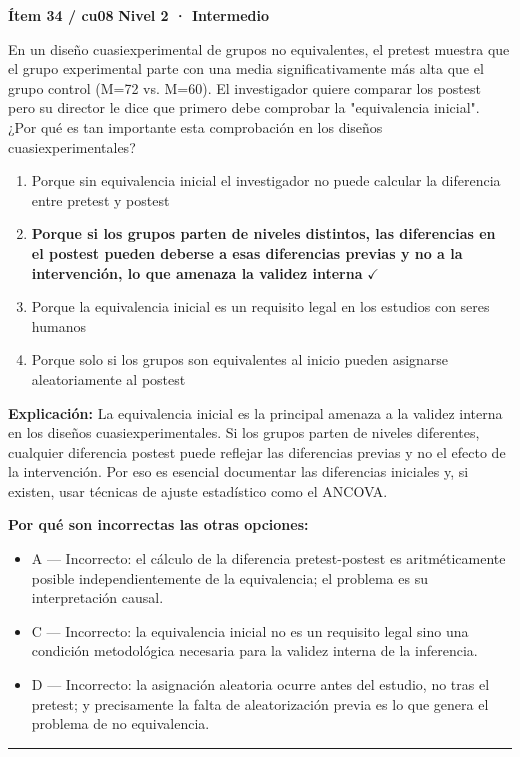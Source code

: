 \documentclass[12pt,a4paper]{article}
\begin{document}
\begin{mdframed}[backgroundcolor=fondogris,linecolor=ambar,linewidth=1pt,innerleftmargin=10pt,innerrightmargin=10pt,innertopmargin=7pt,innerbottommargin=7pt]
\textbf{Ítem 34 / cu08} \hfill {\small\bfseries\color{ambar} Nivel 2 · Intermedio}
\end{mdframed}

En un diseño cuasiexperimental de grupos no equivalentes, el pretest muestra que el grupo experimental parte con una media significativamente más alta que el grupo control (M=72 vs. M=60). El investigador quiere comparar los postest pero su director le dice que primero debe comprobar la "equivalencia inicial". ¿Por qué es tan importante esta comprobación en los diseños cuasiexperimentales?

\begin{enumerate}
  \item[A.] Porque sin equivalencia inicial el investigador no puede calcular la diferencia entre pretest y postest
  \item[\textbf{\color{verde}B.}] \textbf{\color{verde} Porque si los grupos parten de niveles distintos, las diferencias en el postest pueden deberse a esas diferencias previas y no a la intervención, lo que amenaza la validez interna} \hfill $\checkmark$
  \item[C.] Porque la equivalencia inicial es un requisito legal en los estudios con seres humanos
  \item[D.] Porque solo si los grupos son equivalentes al inicio pueden asignarse aleatoriamente al postest
\end{enumerate}

\noindent\textbf{\color{azul}Explicación:} La equivalencia inicial es la principal amenaza a la validez interna en los diseños cuasiexperimentales. Si los grupos parten de niveles diferentes, cualquier diferencia postest puede reflejar las diferencias previas y no el efecto de la intervención. Por eso es esencial documentar las diferencias iniciales y, si existen, usar técnicas de ajuste estadístico como el ANCOVA.

\noindent\textbf{\color{gris}Por qué son incorrectas las otras opciones:}
\begin{itemize}
  \item {\small A — Incorrecto: el cálculo de la diferencia pretest-postest es aritméticamente posible independientemente de la equivalencia; el problema es su interpretación causal.}
  \item {\small C — Incorrecto: la equivalencia inicial no es un requisito legal sino una condición metodológica necesaria para la validez interna de la inferencia.}
  \item {\small D — Incorrecto: la asignación aleatoria ocurre antes del estudio, no tras el pretest; y precisamente la falta de aleatorización previa es lo que genera el problema de no equivalencia.}
\end{itemize}
\vspace{8pt}\hrule\vspace{10pt}
\end{document}
